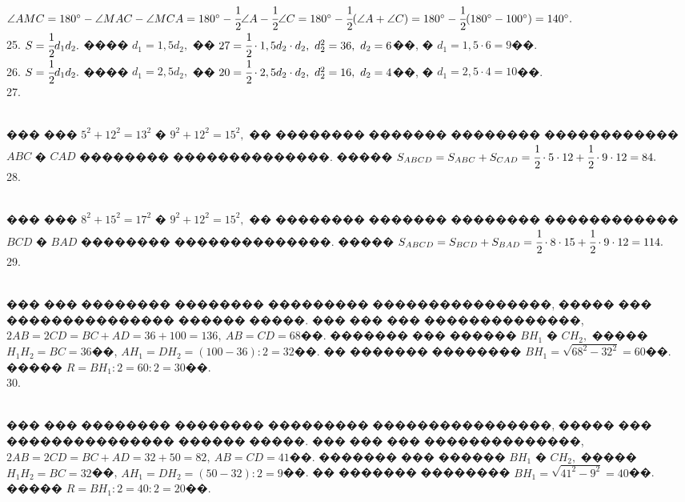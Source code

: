 \documentclass[12pt]{article}
\begin{document}
$\angle AMC=180^\circ-\angle MAC-\angle MCA=180^\circ-\cfrac{1}{2}\angle A-\cfrac{1}{2}\angle C=180^\circ-\cfrac{1}{2}(\angle A+\angle C)=
180^\circ-\cfrac{1}{2}(180^\circ-100^\circ)=140^\circ.$\\
25. $S=\cfrac{1}{2}d_1d_2.$ ���� $d_1=1,5d_2,$ �� $27=\cfrac{1}{2}\cdot1,5d_2\cdot d_2,\ d_2^2=36,\ d_2=6$��, � $d_1=1,5\cdot6=9$��.\\
26. $S=\cfrac{1}{2}d_1d_2.$ ���� $d_1=2,5d_2,$ �� $20=\cfrac{1}{2}\cdot2,5d_2\cdot d_2,\ d_2^2=16,\ d_2=4$��, � $d_1=2,5\cdot4=10$��.\\
27. \begin{figure}[ht!]
\end{figure}\\
��� ��� $5^2+12^2=13^2$ � $9^2+12^2=15^2,$ �� �������� ������� �������� ������������ $ABC$ � $CAD$ �������� ��������������. ����� $S_{ABCD}=S_{ABC}+S_{CAD}=\cfrac{1}{2}\cdot5\cdot12+\cfrac{1}{2}\cdot9\cdot12=84.$\\
28. \begin{figure}[ht!]
\end{figure}\\
��� ��� $8^2+15^2=17^2$ � $9^2+12^2=15^2,$ �� �������� ������� �������� ������������ $BCD$ � $BAD$ �������� ��������������. ����� $S_{ABCD}=S_{BCD}+S_{BAD}=\cfrac{1}{2}\cdot8\cdot15+\cfrac{1}{2}\cdot9\cdot12=114.$\\
29. \begin{figure}[ht!]
\end{figure}\\
��� ��� �������� �������� ��������� ����������������, ����� ��� ��������������� ������ �����. ��� ��� ��� ��������������, $2AB=2CD=BC+AD=36+100=136,\ AB=CD=68$��. ������� ��� ������ $BH_1$ � $CH_2,$ ����� $H_1H_2=BC=36$��, $AH_1=DH_2=(100-36):2=32$��. �� ������� �������� $BH_1=\sqrt{68^2-32^2}=60$��. ����� $R=BH_1:2=60:2=30$��.\\
30. \begin{figure}[ht!]
\end{figure}\\
��� ��� �������� �������� ��������� ����������������, ����� ��� ��������������� ������ �����. ��� ��� ��� ��������������, $2AB=2CD=BC+AD=32+50=82,\ AB=CD=41$��. ������� ��� ������ $BH_1$ � $CH_2,$ ����� $H_1H_2=BC=32$��, $AH_1=DH_2=(50-32):2=9$��. �� ������� �������� $BH_1=\sqrt{41^2-9^2}=40$��. ����� $R=BH_1:2=40:2=20$��.\newpage\noindent
\end{document}

